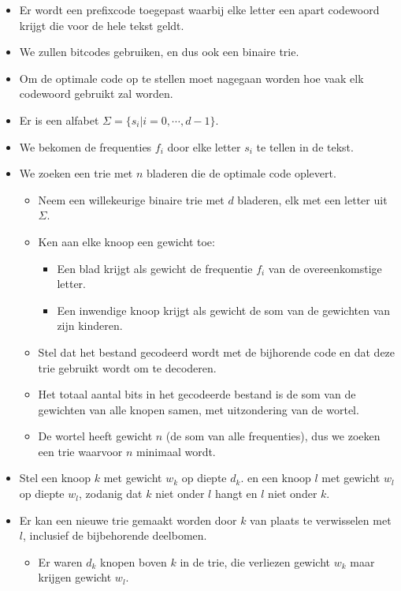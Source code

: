 \begin{itemize}
    \item Er wordt een prefixcode toegepast waarbij elke letter een apart codewoord krijgt die voor de hele tekst geldt.
    \item We zullen bitcodes gebruiken, en dus ook een binaire trie.
    \item Om de optimale code op te stellen moet nagegaan worden hoe vaak elk codewoord gebruikt zal worden.
    \item Er is een alfabet $\Sigma = \{s_i | i = 0, \cdots, d - 1\}$.
    \item We bekomen de frequenties $f_i$ door elke letter $s_i$ te tellen in de tekst.
    \item We zoeken een trie met $n$ bladeren die de optimale code oplevert.
    \begin{itemize}
        \item Neem een willekeurige binaire trie met $d$ bladeren, elk met een letter uit $\Sigma$.
        \item Ken aan elke knoop een gewicht toe:
        \begin{itemize}
            \item Een blad krijgt als gewicht de frequentie $f_i$ van de overeenkomstige letter.
            \item Een inwendige knoop krijgt als gewicht de som van de gewichten van zijn kinderen.
        \end{itemize}
        \item Stel dat het bestand gecodeerd wordt met de bijhorende code en dat deze trie gebruikt wordt om te decoderen.
        \item Het totaal aantal bits in het gecodeerde bestand is de som van de gewichten van alle knopen samen, met uitzondering van de wortel.
        \item De wortel heeft gewicht $n$ (de som van alle frequenties), dus we zoeken een trie waarvoor $n$ minimaal wordt.
    \end{itemize}
    \item Stel een knoop $k$ met gewicht $w_k$ op diepte $d_k$. en een knoop $l$ met gewicht $w_l$ op diepte $w_l$, zodanig dat $k$ niet onder $l$ hangt en $l$ niet onder $k$.
    \item Er kan een nieuwe trie gemaakt worden door $k$ van plaats te verwisselen met $l$, inclusief de bijbehorende deelbomen. 
    \begin{itemize}
        \item Er waren $d_k$ knopen boven $k$ in de trie, die verliezen gewicht $w_k$ maar krijgen gewicht $w_l$.

\end{itemize}
\end{itemize}
